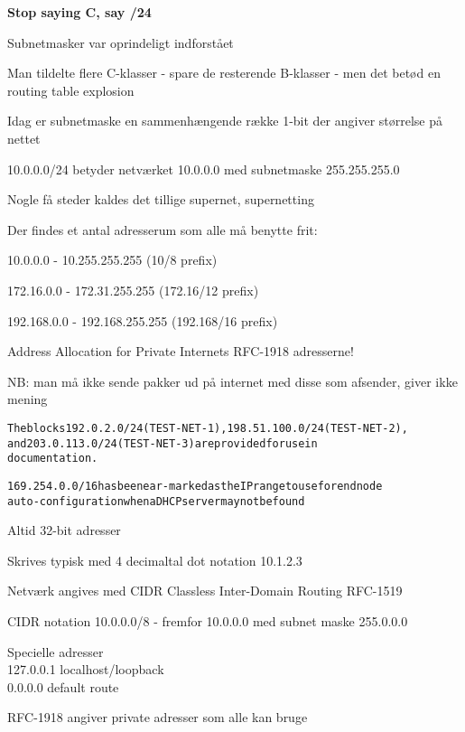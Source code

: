 \documentclass[Screen16to9,17pt]{foils}
\begin{document}
\vskip 5mm
\centerline{\bf Stop saying C, say /24}



\begin{list1}
\item Subnetmasker var oprindeligt indforstået
\item Man tildelte flere C-klasser - spare de resterende B-klasser - men det betød en routing table explosion
\item Idag er subnetmaske en sammenhængende række 1-bit der angiver størrelse på nettet
\item 10.0.0.0/24 betyder netværket 10.0.0.0 med subnetmaske 255.255.255.0
\item Nogle få steder kaldes det tillige supernet, supernetting
\end{list1}


\begin{list1}
\item Der findes et antal adresserum som alle må benytte frit:
\begin{list2}
\item 10.0.0.0    -  10.255.255.255  (10/8 prefix)
\item 172.16.0.0  -  172.31.255.255  (172.16/12 prefix)
\item 192.168.0.0 -  192.168.255.255 (192.168/16 prefix)
\end{list2}
\item Address Allocation for Private Internets RFC-1918 adresserne!
\item NB: man må ikke sende pakker ud på internet med disse som afsender, giver ikke mening
\end{list1}

\begin{alltt}
The blocks 192.0.2.0/24 (TEST-NET-1), 198.51.100.0/24 (TEST-NET-2),
and 203.0.113.0/24 (TEST-NET-3) are provided for use in
documentation.

169.254.0.0/16 has been ear-marked as the IP range to use for end node
auto-configuration when a DHCP server may not be found
\end{alltt}


\begin{list2}
\item Altid 32-bit adresser
\item Skrives typisk med 4 decimaltal dot notation 10.1.2.3
\item Netværk angives med CIDR Classless Inter-Domain Routing RFC-1519
\item CIDR notation 10.0.0.0/8 -
  fremfor 10.0.0.0 med subnet maske 255.0.0.0
\item Specielle adresser\\
127.0.0.1 localhost/loopback\\
0.0.0.0  default route
\item RFC-1918 angiver private adresser som alle kan bruge
\end{list2}
\end{document}
